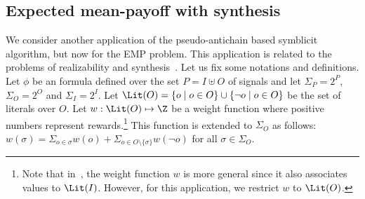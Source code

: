 \subsection{Expected mean-payoff with \LTLMP synthesis}
We consider another application of the pseudo-antichain based symblicit algorithm, but now for the EMP problem. This application is related to the problems of \LTLMP realizability and synthesis~\cite{DBLP:journals/corr/abs-1210-3539,DBLP:conf/tacas/BohyBFR13}. Let us fix some notations and definitions. Let $\phi$ be an \LTL formula defined over the set $P = I \uplus O$ of signals and let $\Sigma_P = 2^P$, $\Sigma_O = 2^O$ and $\Sigma_I = 2^I$. Let $\Lit(O) = \{o \mid o \in O\} \cup \{\neg o \mid o \in O\}$ be the set of literals over $O$. Let $w : \Lit(O) \mapsto \Z$ be a weight function where positive numbers represent rewards.\footnote{Note that in~\cite{DBLP:journals/corr/abs-1210-3539,DBLP:conf/tacas/BohyBFR13}, the weight function $w$ is more general since it also associates values to $\Lit(I)$. However, for this application, we restrict $w$ to $\Lit(O)$.} This function is extended to $\Sigma_O$ as follows:  $w(\sigma) = \Sigma_{o \in \sigma} w(o) +  \Sigma_{o \in O \setminus \{\sigma\}} w(\neg o)$ for all $\sigma \in \Sigma_O$.

